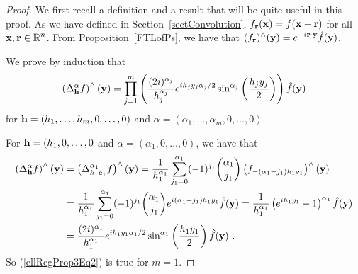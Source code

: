 \begin{proof}
We first recall a definition and a result that will be quite useful in
this proof.  As we have defined in Section~\ref{sectConvolution},
$f_{\mathbf{r}}(\mathbf{x}) = f(\mathbf{x}- \mathbf{r})$ for all
$\displaystyle \mathbf{x},\mathbf{r} \in \mathbb{R}^n$.
From Proposition~\ref{FTLofPs}, we have that
$\displaystyle (f_{\mathbf{r}})^\wedge(\mathbf{y}) =
e^{-i \mathbf{r}\cdot\mathbf{y}} \hat{f}(\mathbf{y})$.

We prove by induction that
\begin{equation} \label{ellRegProp3Eq2}
\left(\Delta^\alpha_{\mathbf{h}} f\right)^\wedge(\mathbf{y})
= \prod_{j=1}^m \left(\frac{(2i)^{\alpha_j}}
{h_j^{\alpha_j}} e^{i h_j y_j \alpha_j/2}
\sin^{\alpha_j}\left(\frac{h_j y_j}{2}\right) \right)\hat{f}(\mathbf{y})
\end{equation}
for $\mathbf{h} = (h_1,\ldots,h_m,0,\ldots,0)$ and
$\alpha = (\alpha_1,\ldots,\alpha_m,0,\ldots,0)$.

For $\mathbf{h} = (h_1,0,\ldots,0$ and $\alpha = (\alpha_1,0,\ldots,0)$,
we have that
\begin{align*}
\left(\Delta^\alpha_{\mathbf{h}} f \right)^\wedge(\mathbf{y})
&= \left(\Delta^{\alpha_1}_{h_1 \mathbf{e}_1} f \right)^\wedge(\mathbf{y})
= \frac{1}{h_1^{\alpha_1}} \sum_{j_1=0}^{\alpha_1} (-1)^{j_1}
\binom{\alpha_1}{j_1}
\left(f_{-(\alpha_1-j_1)h_1 \mathbf{e}_1}\right)^\wedge(\mathbf{y}) \\
&= \frac{1}{h_1^{\alpha_1}} \sum_{j_1=0}^{\alpha_1} (-1)^{j_1}
\binom{\alpha_1}{j_1} e^{i(\alpha_1-j_1) h_1 y_1} \hat{f}(\mathbf{y})
= \frac{1}{h_1^{\alpha_1}} \left(e^{i h_1 y_1} - 1\right)^{\alpha_1}
\hat{f}(\mathbf{y}) \\
&= \frac{(2i)^{\alpha_1}}{h_1^{\alpha_1}} e^{i h_1 y_1 \alpha_1/2}
\sin^{\alpha_1}\left(\frac{h_1 y_1}{2}\right) \hat{f}(\mathbf{y}) \ .
\end{align*}
So (\ref{ellRegProp3Eq2}) is true for $m=1$.


\end{proof}
